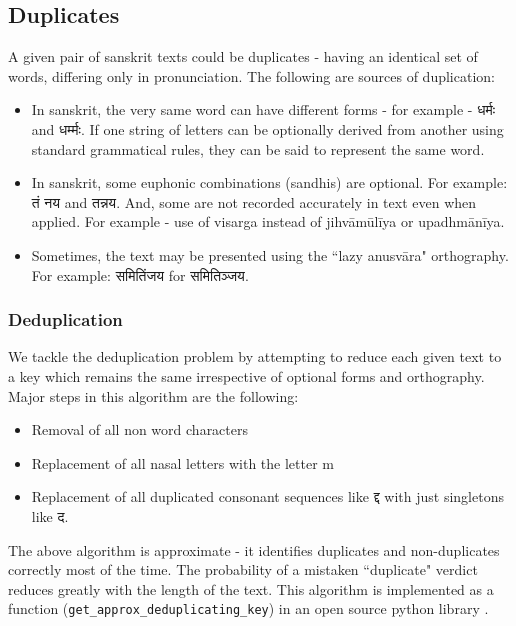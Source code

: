 \documentclass[11pt]{article}
\begin{document}
\subsection{Duplicates}
A given pair of sanskrit texts could be duplicates - having an identical set of words, differing only in pronunciation. The following are sources of duplication:

\begin{itemize}
\tightlist
\item
In sanskrit, the very same word can have different forms - for example - {\skt धर्मः} and {\skt धर्म्मः}. If one string of letters can be optionally derived from another using standard grammatical rules, they can be said to represent the same word.

\item
In sanskrit, some euphonic combinations (sandhis) are optional. For example: {\skt तं नय} and {\skt तन्नय}. And, some are not recorded accurately in text even when applied. For example - use of visarga instead of jihvāmūlīya or upadhmānīya.

\item
Sometimes, the text may be presented using the ``lazy anusvāra" orthography. For example: {\skt समितिंजय} for {\skt समितिञ्जय}.
\end{itemize}

\subsubsection{Deduplication}
We tackle the deduplication problem by attempting to reduce each given text to a key which remains the same irrespective of optional forms and orthography. Major steps in this algorithm are the following:

\begin{itemize}
\tightlist
\item
Removal of all non word characters

\item
Replacement of all nasal letters with the letter m

\item
Replacement of all duplicated consonant sequences like {\skt द्द} with just singletons like {\skt द}.
\end{itemize}

The above algorithm is approximate - it identifies duplicates and non-duplicates correctly most of the time. The probability of a mistaken ``duplicate" verdict reduces greatly with the length of the text. This algorithm is implemented as a function (\verb^get_approx_deduplicating_key^) in an open source python library \cite{indic_transliteration_py}. 
\end{document}
